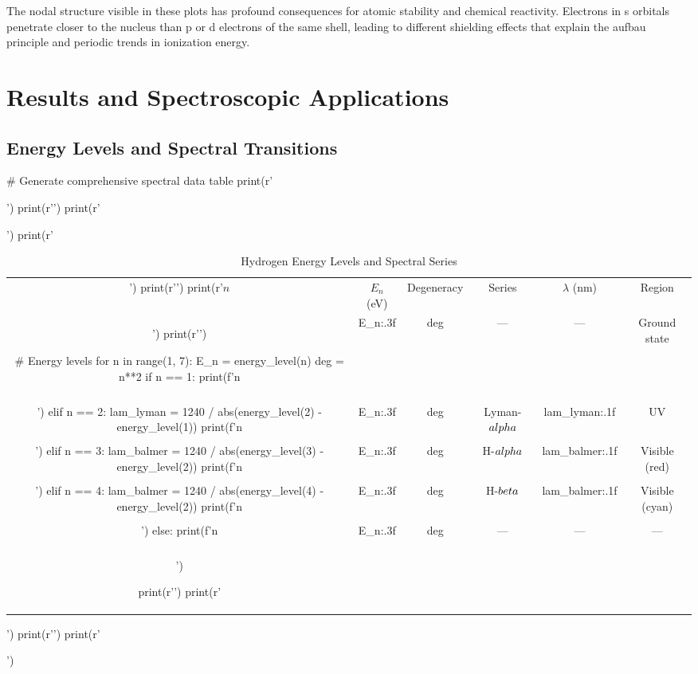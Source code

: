 \documentclass[11pt,a4paper]{article}
\begin{document}
The nodal structure visible in these plots has profound consequences for atomic stability and chemical reactivity. Electrons in s orbitals penetrate closer to the nucleus than p or d electrons of the same shell, leading to different shielding effects that explain the aufbau principle and periodic trends in ionization energy.

\section{Results and Spectroscopic Applications}

\subsection{Energy Levels and Spectral Transitions}

\begin{pycode}
# Generate comprehensive spectral data table
print(r'\begin{table}[H]')
print(r'\centering')
print(r'\caption{Hydrogen Energy Levels and Spectral Series}')
print(r'\begin{tabular}{cccccc}')
print(r'\toprule')
print(r'$n$ & $E_n$ (eV) & Degeneracy & Series & $\lambda$ (nm) & Region \\')
print(r'\midrule')

# Energy levels
for n in range(1, 7):
    E_n = energy_level(n)
    deg = n**2
    if n == 1:
        print(f'{n} & {E_n:.3f} & {deg} & --- & --- & Ground state \\\\')
    elif n == 2:
        lam_lyman = 1240 / abs(energy_level(2) - energy_level(1))
        print(f'{n} & {E_n:.3f} & {deg} & Lyman-$\\alpha$ & {lam_lyman:.1f} & UV \\\\')
    elif n == 3:
        lam_balmer = 1240 / abs(energy_level(3) - energy_level(2))
        print(f'{n} & {E_n:.3f} & {deg} & H-$\\alpha$ & {lam_balmer:.1f} & Visible (red) \\\\')
    elif n == 4:
        lam_balmer = 1240 / abs(energy_level(4) - energy_level(2))
        print(f'{n} & {E_n:.3f} & {deg} & H-$\\beta$ & {lam_balmer:.1f} & Visible (cyan) \\\\')
    else:
        print(f'{n} & {E_n:.3f} & {deg} & --- & --- & --- \\\\')

print(r'\bottomrule')
print(r'\end{tabular}')
print(r'\label{tab:energy}')
print(r'\end{table}')
\end{pycode}
\end{document}
